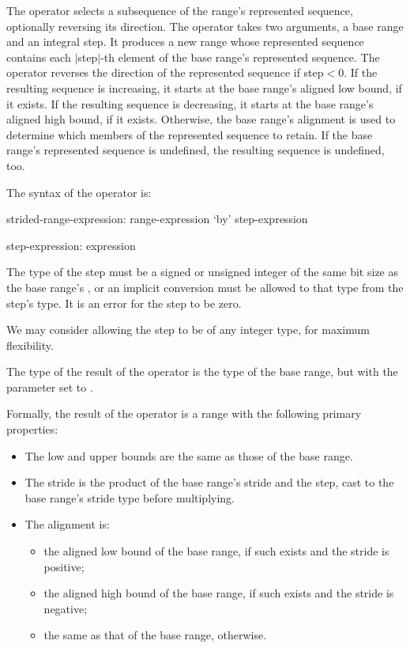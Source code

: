 The  operator selects a subsequence of the range's represented sequence,
optionally reversing its direction.
The operator takes two arguments, a base range and an integral step.
It produces a new range whose represented sequence contains
each $|$step$|$-th element of the base range's represented sequence.
The operator reverses the direction of the represented sequence if step$<$0.
If the resulting sequence is increasing,
it starts at the base range's aligned low bound, if it exists.
If the resulting sequence is decreasing,
it starts at the base range's aligned high bound, if it exists.
%
Otherwise, the base range's alignment is used to determine
which members of the represented sequence to retain.
%
If the base range's represented sequence is undefined,
the resulting sequence is undefined, too.

The syntax of the  operator is:
\begin{syntax}
strided-range-expression:
  range-expression `by' step-expression

step-expression:
  expression
\end{syntax}

The type of the step must be a signed or unsigned integer of the same
bit size as the base range's , or an implicit conversion must be allowed
to that type from the step's type.
It is an error for the step to be zero.

\begin{future}
We may consider allowing the step to be of any integer type,
for maximum flexibility.
\end{future}

The type of the result of the  operator is the type of the
base range, but with the  parameter set to .

Formally, the result of the  operator is a range with the following
primary properties:

\begin{itemize}

\item The low and upper bounds are the same as those of the base range.

\item The stride is the product of the base range's stride
      and the step, cast to the base range's stride type before multiplying.

\item The alignment is:

  \begin{itemize}
 
  \item the aligned low bound of the base range, if such exists
        and the stride is positive;

  \item the aligned high bound of the base range, if such exists
        and the stride is negative;

  \item the same as that of the base range, otherwise.

  \end{itemize}

\end{itemize}

